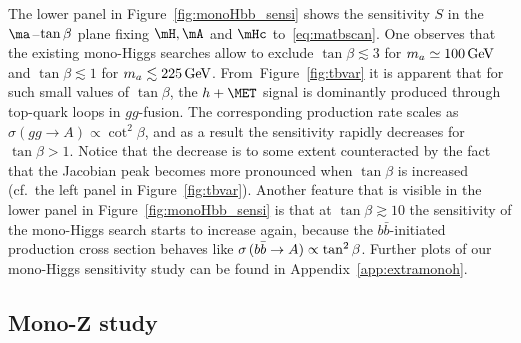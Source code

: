 {\color{red} The lower panel in Figure~\ref{fig:monoHbb_sensi} shows the sensitivity $S$ in the $\ma\hspace{0.25mm}$--$\hspace{0.25mm}\tan \beta$ plane fixing  $\mH, \mA$ and  $\mHc$ to~\eqref{eq:matbscan}.} One observes that the existing mono-Higgs searches allow to exclude $\tan \beta \lesssim 3$ for $m_a \simeq 100 \, {\rm GeV}$ and $\tan \beta \lesssim 1$ for $m_a \lesssim 225 \, {\rm GeV}$. From~Figure~\ref{fig:tbvar} it is apparent that for such small values of $\tan \beta$, the $h + \MET$ signal is dominantly produced through top-quark loops in $gg$-fusion. The corresponding production rate scales as $\sigma \left ( gg \to A \right ) \propto \cot^2 \beta$, and as a result the sensitivity rapidly decreases for $\tan \beta > 1$. Notice that the decrease is to some extent counteracted by the fact that the Jacobian peak becomes more pronounced when  $\tan \beta$ is increased (cf.~the left panel in Figure~\ref{fig:tbvar}). Another feature that is visible in the  lower panel in Figure~\ref{fig:monoHbb_sensi}  is that at $\tan \beta \gtrsim 10$ the sensitivity of the mono-Higgs search  starts to increase again, because the $b \bar b$-initiated production cross section behaves like $\sigma \hspace{0.5mm} ( b \bar b \to A  ) \propto \tan^2 \beta$. Further plots of our mono-Higgs sensitivity study can be found in Appendix~\ref{app:extramonoh}.

\subsection[Mono-$Z$ study]{Mono-$\bm{Z}$ study}
\label{sec:sensi_monozll}

